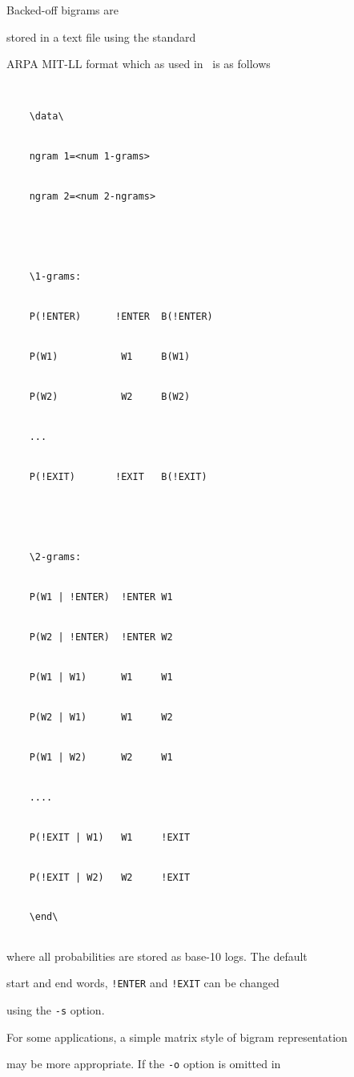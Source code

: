 Backed-off bigrams are 


stored in a text file using the standard


ARPA MIT-LL format which as used in \HTK\ is as follows





\begin{verbatim}


    \data\


    ngram 1=<num 1-grams>


    ngram 2=<num 2-ngrams>





    \1-grams:


    P(!ENTER)      !ENTER  B(!ENTER)


    P(W1)           W1     B(W1)


    P(W2)           W2     B(W2)


    ...


    P(!EXIT)       !EXIT   B(!EXIT)





    \2-grams:


    P(W1 | !ENTER)  !ENTER W1


    P(W2 | !ENTER)  !ENTER W2


    P(W1 | W1)      W1     W1


    P(W2 | W1)      W1     W2


    P(W1 | W2)      W2     W1


    ....


    P(!EXIT | W1)   W1     !EXIT


    P(!EXIT | W2)   W2     !EXIT


    \end\


\end{verbatim}


where all probabilities are stored as base-10 logs.  The default


start and end words, \texttt{!ENTER} and \texttt{!EXIT} can be changed


using the  \texttt{-s} option.





For some applications, a simple matrix style of bigram representation


may be more appropriate.  If the \texttt{-o} option is omitted in


